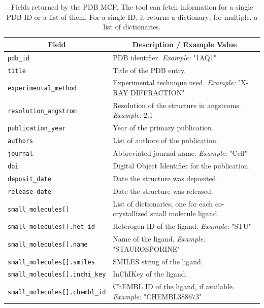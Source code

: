 \documentclass{article}
\begin{document}
\begin{table}[!htbp]
\caption{Fields returned by the PDB MCP. The tool can fetch information for a single PDB ID or a list of them. For a single ID, it returns a dictionary; for multiple, a list of dictionaries.}
\label{tab:pdb-mcp}
\centering
\begin{tabularx}{\textwidth}{p{5.5cm}X}
\toprule
\multicolumn{1}{c}{\bf Field} & \multicolumn{1}{c}{\bf Description / Example Value} \\
\midrule
\texttt{pdb\_id} & PDB identifier. \emph{Example:} "1AQ1" \\
\addlinespace
\texttt{title} & Title of the PDB entry. \\
\addlinespace
\texttt{experimental\_method} & Experimental technique used. \emph{Example:} "X-RAY DIFFRACTION" \\
\addlinespace
\texttt{resolution\_angstrom} & Resolution of the structure in angstroms. \emph{Example:} 2.1 \\
\addlinespace
\texttt{publication\_year} & Year of the primary publication. \\
\addlinespace
\texttt{authors} & List of authors of the publication. \\
\addlinespace
\texttt{journal} & Abbreviated journal name. \emph{Example:} "Cell" \\
\addlinespace
\texttt{doi} & Digital Object Identifier for the publication. \\
\addlinespace
\texttt{deposit\_date} & Date the structure was deposited. \\
\addlinespace
\texttt{release\_date} & Date the structure was released. \\
\addlinespace
\texttt{small\_molecules[]} & List of dictionaries, one for each co-crystallized small molecule ligand. \\
\addlinespace
\texttt{small\_molecules[].het\_id} & Heterogen ID of the ligand. \emph{Example:} "STU" \\
\addlinespace
\texttt{small\_molecules[].name} & Name of the ligand. \emph{Example:} "STAUROSPORINE" \\
\addlinespace
\texttt{small\_molecules[].smiles} & SMILES string of the ligand. \\
\addlinespace
\texttt{small\_molecules[].inchi\_key} & InChIKey of the ligand. \\
\addlinespace
\texttt{small\_molecules[].chembl\_id} & ChEMBL ID of the ligand, if available. \emph{Example:} "CHEMBL388673" \\
\bottomrule
\end{tabularx}
\end{table}
\end{document}
